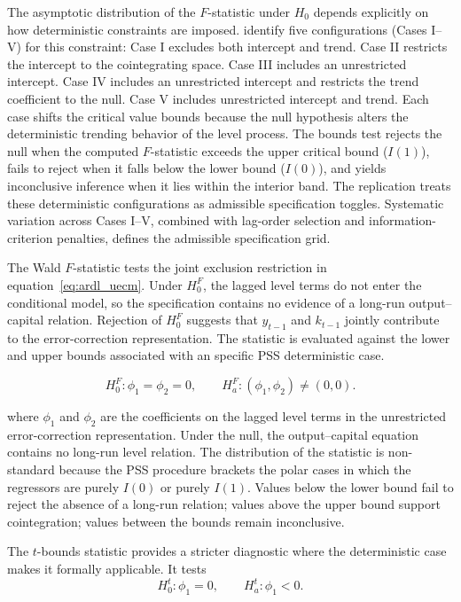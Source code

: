 \documentclass[11pt]{article}
\begin{document}
The asymptotic distribution of the $F$-statistic under $H_0$ depends explicitly on how deterministic constraints are imposed. \citet{Pesaran2001} identify five configurations (Cases I--V) for this constraint: Case I excludes both intercept and trend. Case II restricts the intercept to the cointegrating space. Case III includes an unrestricted intercept. Case IV includes an unrestricted intercept and restricts the trend coefficient to the null. Case V includes unrestricted intercept and trend. Each case shifts the critical value bounds because the null hypothesis alters the deterministic trending behavior of the level process. The bounds test rejects the null when the computed $F$-statistic exceeds the upper critical bound ($I(1)$), fails to reject when it falls below the lower bound ($I(0)$), and yields inconclusive inference when it lies within the interior band. The replication treats these deterministic configurations as admissible specification toggles. Systematic variation across Cases I--V, combined with lag-order selection and information-criterion penalties, defines the admissible specification grid.

The Wald $F$-statistic tests the joint exclusion restriction in equation~\eqref{eq:ardl_uecm}. Under $H_{0}^{F}$, the lagged level terms do not enter the conditional model, so the specification contains no evidence of a long-run output--capital relation. Rejection of $H_{0}^{F}$ suggests that $y_{t-1}$ and $k_{t-1}$ jointly contribute to the error-correction representation. The statistic is evaluated against the lower and upper bounds associated with an specific PSS deterministic case.

\begin{equation}
H_{0}^{F}: \phi_1=\phi_2=0,
\qquad
H_{a}^{F}: (\phi_1,\phi_2)\neq(0,0).
\label{eq:fbounds_hypothesis}
\end{equation}

where $\phi_1$ and $\phi_2$ are the coefficients on the lagged level terms in the unrestricted error-correction representation. Under the null, the output--capital equation contains no long-run level relation. The distribution of the statistic is non-standard because the PSS procedure brackets the polar cases in which the regressors are purely $I(0)$ or purely $I(1)$. Values below the lower bound fail to reject the absence of a long-run relation; values above the upper bound support cointegration; values between the bounds remain inconclusive.

The $t$-bounds statistic provides a stricter diagnostic where the deterministic case makes it formally applicable. It tests
\begin{equation}
H_{0}^{t}: \phi_1=0,
\qquad
H_{a}^{t}: \phi_1<0.
\label{eq:tbounds_hypothesis}
\end{equation}
\end{document}
